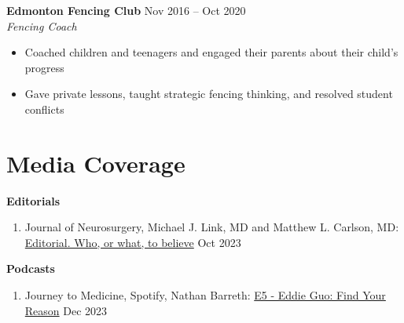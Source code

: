 \documentclass{article}
\begin{document}
\textbf{Edmonton Fencing Club} \hfill Nov 2016 -- Oct 2020 \\
\textit{Fencing Coach}
\begin{itemize}
    \item Coached children and teenagers and engaged their parents about their child's progress
    \item Gave private lessons, taught strategic fencing thinking, and resolved student conflicts
\end{itemize}


\section*{\textcolor{my_colour}{Media Coverage}}
\vspace{-.25em} \hrulefill \vspace{.25em}

\textbf{Editorials} \vspace{.5em}
\begin{enumerate}
    \item Journal of Neurosurgery, Michael J. Link, MD and Matthew L. Carlson, MD: \href{https://thejns.org/view/journals/j-neurosurg/139/4/article-p1001.xml}{Editorial. Who, or what, to believe} \hfill Oct 2023
\end{enumerate} \vspace{1em}

\textbf{Podcasts} \vspace{.5em}
\begin{enumerate}
    \item Journey to Medicine, Spotify, Nathan Barreth: \href{https://open.spotify.com/episode/61ah1zCA0stsM13zechA8C?si=ff46203a4e5a4721}{E5 - Eddie Guo: Find Your Reason} \hfill Dec 2023
\end{enumerate} \vspace{1em}
\end{document}
